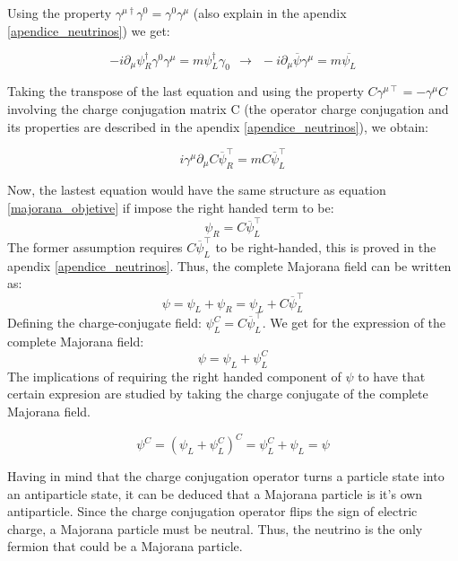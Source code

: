 Using the property $\gamma^{\mu \dagger} \gamma^0 = \gamma^0 \gamma^\mu$ (also explain in the apendix \ref{apendice_neutrinos}) we get:

\begin{equation}
-i \partial_\mu \psi^{\dagger}_R \gamma^0 \gamma^\mu = m \psi^\dagger_L \gamma_0
              \ \ \rightarrow \ \ -i \partial_\mu \overline{\psi}\gamma^\mu = m \overline{\psi_L}
\end{equation}

Taking the transpose of the last equation and using the property $C \gamma^{\mu \intercal} = - \gamma^\mu C$ involving the charge conjugation matrix C (the operator charge conjugation and its properties are described in the apendix \ref{apendice_neutrinos}), we obtain:

\begin{equation}
i \gamma^\mu \partial_\mu C \overline{\psi}^\intercal_R = m C \overline{\psi}^{\intercal}_L
\end{equation}

Now, the lastest equation would have the same structure as equation \ref{majorana_objetive} if impose the right handed term to be:
\begin{equation}
\psi_R = C \overline{\psi}^\intercal_L
\end{equation}
The former assumption requires $C \overline{\psi}^\intercal_L$ to be right-handed, this is proved in the apendix \ref{apendice_neutrinos}. Thus, the complete Majorana field can be written as:
\begin{equation}
\psi = \psi_L + \psi_R = \psi_L + C \overline{\psi}^\intercal_L
\end{equation}
Defining the charge-conjugate field: $\psi^C_L = C \overline{\psi}^\intercal_L$. We get for the expression of the complete Majorana field:
\begin{equation}
\psi = \psi_L + \psi^C_L
\end{equation}
The implications of requiring the right handed component of $\psi$ to have that certain expresion are studied by taking the charge conjugate of the complete Majorana field. 

\begin{equation}
\psi^C = (\psi_L + \psi^C_L)^C = \psi^C_L + \psi_L = \psi
\end{equation}

Having in mind that the charge conjugation operator turns a particle state into an antiparticle state, it can be deduced that a Majorana particle is it's own antiparticle. Since the charge conjugation operator flips the sign of electric charge, a Majorana particle must be neutral. Thus, the neutrino is the only fermion that could be a Majorana particle.

